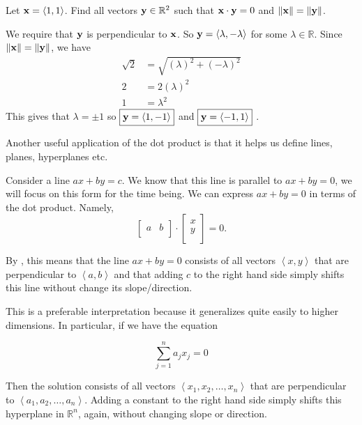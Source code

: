 \begin{exercise}
    Let \( \vb{x} = \left< 1,1 \right> \). Find all vectors \( \vb{y} \in \mathbb{R}^{2} \) such that \( \vb{x} \cdot \vb{y} =0 \) and \( \norm{\vb{x}} = \norm{\vb{y}} \).
\end{exercise}
\begin{solution}
    We require that \( \vb{y} \) is perpendicular to \( \vb{x} \). So \( \vb{y} = \left< \lambda, - \lambda \right> \) for some \( \lambda \in \mathbb{R}. \) Since \( \norm{\vb{x}} = \norm{\vb{y}} \), we have 
    \begin{align*}
        \sqrt{2} &= \sqrt{ \left( \lambda  \right)^{2} + \left( -\lambda \right)^{2}} \\
        2 &= 2 \left( \lambda \right)^{2}\\
        1&= \lambda^{2}
    \end{align*}
    This gives that \( \lambda =\pm 1 \) so \( \boxed{ \vb{y} = \left< 1,-1 \right>} \) and \( \boxed{\vb{y} = \left< -1,1 \right>} \; \).
\end{solution}


Another useful application of the dot product is that it helps us define lines, planes, hyperplanes etc. 


Consider a line \( a x+by =c \). We know that this line is parallel to \( ax+by=0 \), we will focus on this form for the time being. We can express \( ax+by=0 \) in terms of the dot product. Namely,
\[ \begin{bmatrix}
    a & b\\
\end{bmatrix} \cdot \begin{bmatrix}
    x \\
    y\\
\end{bmatrix} =0 .\]

By , this means that the line \( ax+by=0 \) consists of all vectors \( \left< x,y \right> \) that are perpendicular to \( \left< a,b \right> \) and that adding \( c \) to the right hand side simply shifts this line without change its slope/direction.

This is a preferable interpretation because it generalizes quite easily to higher dimensions. In particular, if we have the equation 

\[ \sum_{j=1}^{n} a_{j} x_{j} =0  \]

Then the solution consists of all vectors \( \left< x_{1}, x_{2}, \dots, x_{n} \right> \) that are perpendicular to \( \left< a_{1}, a_{2}, \dots, a_{n} \right> \). Adding a constant to the right hand side simply shifts this hyperplane in \( \mathbb{R}^{n} \), again, without changing slope or direction. 

